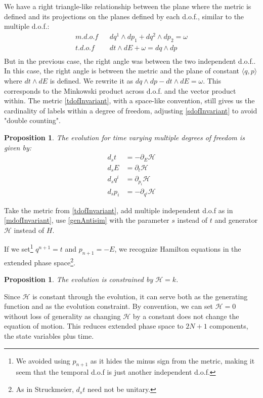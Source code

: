\documentclass[aps,pra,10pt,twocolumn,floatfix,nofootinbib]{revtex4-1}
\newtheorem{prop}[thm]{Proposition}
\theoremstyle{definition}
\begin{document}
We have a right triangle-like relationship between the plane where the metric is defined and its projections on the planes defined by each d.o.f., similar to the multiple d.o.f.:
\begin{align*}
m.d.o.f \;\;\; &dq^1 \wedge dp_1 + dq^2 \wedge dp_2 = \omega \\
t.d.o.f \;\;\; &dt \wedge dE + \omega = dq \wedge dp \\
\end{align*}
But in the previous case, the right angle was between the two independent d.o.f.. In this case, the right angle is between the metric and the plane of constant $\langle q, p \rangle$ where $dt \wedge dE$ is defined. We rewrite it as $dq \wedge dp - dt \wedge dE = \omega$. This corresponds to the Minkowski product across d.o.f. and the vector product within. The metric \ref{tdofInvariant}, with a space-like convention, still gives us the cardinality of labels within a degree of freedom, adjusting \ref{sdofInvariant} to avoid "double counting".

\begin{prop}\label{tdofHam}
The evolution for time varying multiple degrees of freedom is given by:
\begin{align*}
d_{s}t &= - \partial_{E} \mathcal{H} \\
d_{s}E &= \partial_{t} \mathcal{H} \\
d_{s}q^i &= \partial_{p_i} \mathcal{H} \\
d_{s}p_i &= - \partial_{q^i} \mathcal{H}
\end{align*}
\end{prop}

Take the metric from \ref{tdofInvariant}, add multiple independent d.o.f as in \ref{mdofInvariant}, use \ref{genAntisim} with the parameter $s$ instead of $t$ and generator $\mathcal{H}$ instead of $H$.

If we set\footnote{We avoided using $p_{n+1}$ as it hides the minus sign from the metric, making it seem that the temporal d.o.f is just another independent d.o.f.} $q^{n+1}=t$ and $p_{n+1}=-E$, we recognize Hamilton equations in the extended phase space\footnote{As in Struckmeier\cite{Struckmeier}, $d_{s}t$ need not be unitary.}\cite{Synge,Lanczos}.

\begin{prop}\label{tdofConstrain}
The evolution is constrained by $\mathcal{H}=k$.
\end{prop}

Since $\mathcal{H}$ is constant through the evolution, it can serve both as the generating function and as the evolution constraint. By convention, we can set $\mathcal{H}=0$ without loss of generality as changing $\mathcal{H}$ by a constant does not change the equation of motion. This reduces extended phase space to $2N + 1$ components, the state variables plus time.
\end{document}
